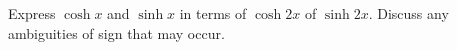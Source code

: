 Express $\cosh x$ and $\sinh x$ in terms of $\cosh 2x$ of $\sinh 2x$.
Discuss any ambiguities of sign that may occur. 

